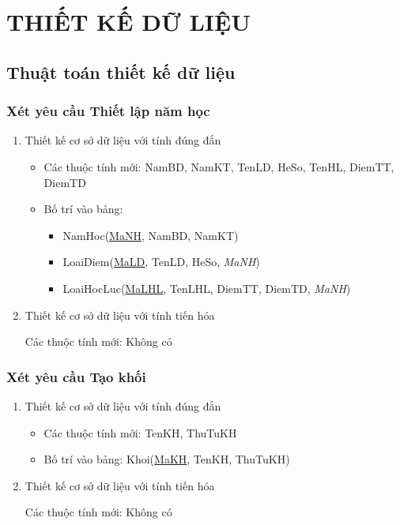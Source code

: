 \documentclass[a4paper]{article}
\begin{document}
\section{THIẾT KẾ DỮ LIỆU}
	\subsection{Thuật toán thiết kế dữ liệu}
	\subsubsection{Xét yêu cầu Thiết lập năm học}
\begin{enumerate}
\item Thiết kế cơ sở dữ liệu với tính đúng đắn
\begin{itemize}
\item Các thuộc tính mới: NamBD, NamKT, TenLD, HeSo, TenHL, DiemTT, DiemTD
\item Bố trí vào bảng: 
\begin{itemize}
\item NamHoc(\underline{MaNH}, NamBD, NamKT)
\item LoaiDiem(\underline{MaLD}, TenLD, HeSo, \textit{MaNH})
\item LoaiHocLuc(\underline{MaLHL}, TenLHL, DiemTT, DiemTD, \textit{MaNH})
\end{itemize}
\end{itemize}

 
\item Thiết kế cơ sở dữ liệu với tính tiến hóa

Các thuộc tính mới: Không có


\end{enumerate}

\subsubsection{Xét yêu cầu Tạo khối}
\begin{enumerate}
\item Thiết kế cơ sở dữ liệu với tính đúng đắn
\begin{itemize}
\item Các thuộc tính mới: TenKH, ThuTuKH
\item Bố trí vào bảng: Khoi(\underline{MaKH}, TenKH, ThuTuKH)
\end{itemize}
\item Thiết kế cơ sở dữ liệu với tính tiến hóa

Các thuộc tính mới: Không có

\end{enumerate}
\end{document}

